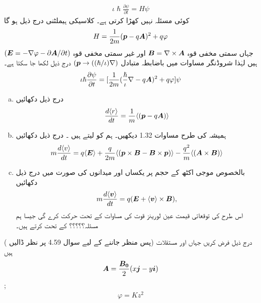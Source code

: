 \begin{align}
    \iota\hslash\frac{\partial\psi}{\partial t}=H\psi
\end{align}
کوئی مسئلہ نہیں کھڑا کرتی ہے۔ کلاسیکی ہیملٹنی درج ذیل ہو گا 
\begin{align}
    H=\frac{1}{2m}({{\boldsymbol{p}}}-q{{\boldsymbol{A}}})^2+q\varphi
\end{align}
 جہاں   سمتی مخفی قوہ \({{\boldsymbol{B}}}=\nabla \times {\ensuremath{{\boldsymbol{A}}}}\) اور  غیر سمتی مخفی قوہ \(({{\boldsymbol{E}}}= -\nabla\varphi-\partial{\ensuremath{{\boldsymbol{A}}}}/\partial t)\) ہیں لہٰذا شروڈنگر مساوات میں باضابطہ متبادل \(({{\boldsymbol{p}}}\rightarrow((\hslash/\iota)\nabla)\) درج ذیل لکھا جا سکتا ہے۔
\begin{align}
    \iota\hslash\frac{\partial\psi}{\partial t}=[\frac{1}{2m}(\frac{\hslash}{\iota}\nabla-q{{\boldsymbol{A}}})^2+q\varphi]\psi
\end{align}
\begin{enumerate}[a.]
\item درج ذیل دکھائیں 
  \begin{align}
    \frac{d\langle r \rangle }{dt}=\frac{1}{m}\langle({{\boldsymbol{p}}}-q{{\boldsymbol{A}}})\rangle
\end{align}
\item ہمیشہ کی طرح مساوات 1.32 دیکھیں۔ ہم   کو  لیتے ہیں ۔ درج ذیل دکھائیں 
\begin{align}
    m\frac{d\langle v \rangle}{dt}=q\langle{\ensuremath{{\boldsymbol{E}}}}\rangle+\frac{q}{2m}\langle({{\boldsymbol{p}}}\times{\ensuremath{{\boldsymbol{B}}}}-{{\boldsymbol{B}}}\times{\ensuremath{{\boldsymbol{p}}}})\rangle-\frac{q^2}{m} \langle ({{\boldsymbol{A}}}\times{\ensuremath{{\boldsymbol{B}}}})\rangle
\end{align}
\item    بالخصوص موجی اکٹھ کے حجم پر یکساں  اور  میدانوں کی صورت میں درج ذیل دکھائیں 
  \begin{align}
    m\frac{d\langle {\ensuremath{{\boldsymbol{v}}}}\rangle}{dt}=q({{\boldsymbol{E}}}+\langle{\ensuremath{{\boldsymbol{v}}}}\rangle\times{\ensuremath{{\boldsymbol{B}}}}),
\end{align}
  اس طرح  کی توقعاتی قیمت عین لورینز قوت کی مساوات کے تحت حرکت کرے گی جیسا ہم مسئلہ؟؟؟؟؟ کے تحت کرتے ہیں۔
\end{enumerate}
( پس منظر جاننے کے لیے سوال 4.59 پر نظر ڈالیں) درج ذیل فرض کریں جہاں  اور   مستقلات ہیں 
\begin{align*}
    {\ensuremath{{\boldsymbol{A}}}}=\frac{{{\boldsymbol{B_0}}}}{2}(x{{\boldsymbol{j}}}-y{{\boldsymbol{i}}})
\end{align*}
;
\begin{align*}
    \varphi=Kz^2
\end{align*} 
